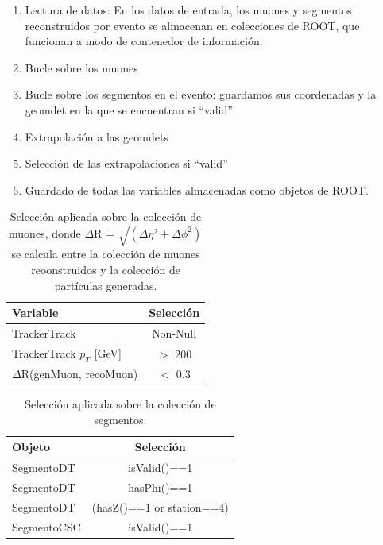 \begin{enumerate}
\item Lectura de datos: En los datos de entrada, los muones y segmentos reconstruidos por evento se almacenan en colecciones de ROOT, que funcionan a modo de contenedor de informaci\'on. 
\item Bucle sobre los muones
\item Bucle sobre los segmentos en el evento: guardamos sus coordenadas y la geomdet en la que se encuentran si ``valid''
\item Extrapolaci\'on a las geomdets
\item Selecci\'on de las extrapolaciones si ``valid''
\item Guardado de todas las variables almacenadas como objetos de ROOT.
\end{enumerate}

\begin{table}[htbp]
  \begin{center}
    {\normalsize
      \begin{tabular} {lc}
        \hline
        \hline
        Variable & Selecci\'on \\
        \hline
        TrackerTrack                          & Non-Null      \\
        TrackerTrack $p_{T}$ [GeV]            & $>$ 200       \\
        $\Delta$R(genMuon, recoMuon)          & $<$ 0.3       \\
        \hline
      \end{tabular}
    }
    \caption{Selecci\'on aplicada sobre la colecci\'on de muones, donde $\Delta$R = $\sqrt{(\Delta\eta^{2}+\Delta\phi^{2})}$ se calcula entre la colecci\'on de muones reoonstruidos y la colecci\'on de part\'iculas generadas.}
    \label{tab:muon_sel}
  \end{center}
\end{table}


\begin{table}[htbp]
  \begin{center}
    {\normalsize
      \begin{tabular} {lc}
        \hline
        \hline
        Objeto & Selecci\'on \\
        \hline
        SegmentoDT            & isValid()==1      \\
        SegmentoDT            & hasPhi()==1       \\
        SegmentoDT            & (hasZ()==1 or station==4)   \\
        SegmentoCSC           & isValid()==1      \\
        \hline
      \end{tabular}
    }
    \caption{Selecci\'on aplicada sobre la colecci\'on de segmentos.}
    \label{tab:segment_sel}
  \end{center}
\end{table}


